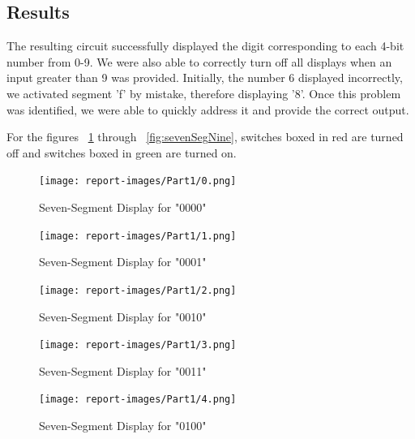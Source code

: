 \documentclass[11pt]{article}
\begin{document}
\subsection{Results}

The resulting circuit successfully displayed the digit corresponding to each 4-bit number from 0-9. We were also able to correctly turn off all displays when an input greater than 9 was provided. Initially, the number 6 displayed incorrectly, we activated segment 'f' by mistake, therefore displaying '8'. Once this problem was identified, we were able to quickly address it and provide the correct output.

\begin{center}
	For the figures ~\ref{fig:sevenSegZero} through ~\ref{fig:sevenSegNine}, switches boxed in red are turned off and switches boxed in green are turned on.
\end{center}

\begin{figure}[H]
\begin{center}
\texttt{[image: report-images/Part1/0.png]}
\caption{Seven-Segment Display for "0000"}
\label{fig:sevenSegZero}
\end{center}
\end{figure}

\begin{figure}[H]
\begin{center}
\texttt{[image: report-images/Part1/1.png]}
\caption{Seven-Segment Display for "0001"}
\label{fig:sevenSegOne}
\end{center}
\end{figure}

\begin{figure}[H]
\begin{center}
\texttt{[image: report-images/Part1/2.png]}
\caption{Seven-Segment Display for "0010"}
\label{fig:sevenSegTwo}
\end{center}
\end{figure}

\begin{figure}[H]
\begin{center}
\texttt{[image: report-images/Part1/3.png]}
\caption{Seven-Segment Display for "0011"}
\label{fig:sevenSegThree}
\end{center}
\end{figure}

\begin{figure}[H]
\begin{center}
\texttt{[image: report-images/Part1/4.png]}
\caption{Seven-Segment Display for "0100"}
\label{fig:sevenSegFour}
\end{center}
\end{figure}
\end{document}
